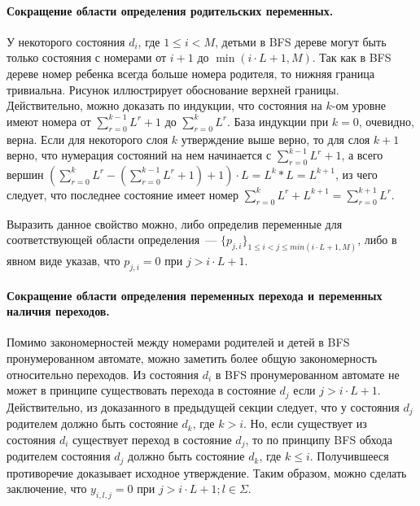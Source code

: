 \paragraph{Сокращение области определения родительских переменных.}
У некоторого состояния $d_{i}$, где $1 \leq i < M$, детьми в BFS дереве могут быть только состояния с номерами от $i + 1$ до $\min\left(i \cdot L + 1, M\right)$.
Так как в BFS дереве номер ребенка всегда больше номера родителя, то нижняя граница тривиальна.
Рисунок  иллюстрирует обоснование верхней границы.
Действительно, можно доказать по индукции, что состояния на $k$-ом уровне имеют номера от $\sum_{r = 0}^{k - 1}L^{r} + 1$ до $\sum_{r = 0}^{k}L^{r}$.
База индукции при $k = 0$, очевидно, верна.
Если для некоторого слоя $k$ утверждение выше верно, то для слоя $k + 1$ верно, что нумерация состояний на нем начинается с $\sum_{r = 0}^{k - 1}L^{r} + 1$, а всего вершин $\left(\sum_{r = 0}^{k}L^{r} - \left(\sum_{r = 0}^{k - 1}L^{r} + 1\right) + 1\right) \cdot L = L^{k} * L = L^{k + 1}$, из чего следует, что последнее состояние имеет номер $\sum_{r = 0}^{k}L^{r} + L^{k + 1} = \sum_{r = 0}^{k + 1}L^{r}$.


Выразить данное свойство можно, либо определив переменные для соответствующей области определения~{---} $\{p_{j,i}\}_{1 \leq i < j \leq min(i \cdot L + 1, M)}$, либо в явном виде указав, что $p_{j,i} = 0$ при $j > i \cdot L + 1$.

\paragraph{Сокращение области определения переменных перехода и переменных наличия переходов.}
Помимо закономерностей между номерами родителей и детей в BFS пронумерованном автомате, можно заметить более общую закономерность относительно переходов.
Из состояния $d_{i}$ в BFS пронумерованном автомате не может в принципе существовать перехода в состояние $d_{j}$ если $j > i \cdot L + 1$.
Действительно, из доказанного в предыдущей секции следует, что у состояния $d_{j}$ родителем должно быть состояние $d_{k}$, где $k > i$.
Но, если существует из состояния $d_{i}$ существует переход в состояние $d_{j}$, то по принципу BFS обхода родителем состояния $d_{j}$ должно быть состояние $d_{k}$, где $k \leq i$.
Получившееся противоречие доказывает исходное утверждение.
Таким образом, можно сделать заключение, что $y_{i,l,j} = 0$ при $j > i \cdot L + 1; l \in \Sigma$.

